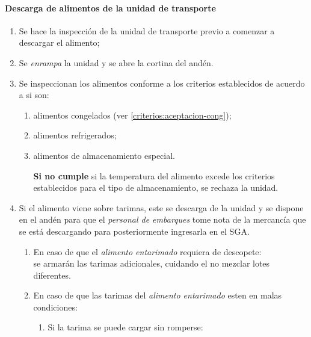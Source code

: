 \paragraph{Descarga de alimentos de la unidad de transporte}\label{sec:DescargaAlimentos}

\begin{enumerate}
    \item Se hace la inspección de la unidad de transporte previo a comenzar a descargar el alimento;
    \item Se \emph{enrampa} la unidad y se abre la cortina del andén.
    \item Se inspeccionan los alimentos conforme a los criterios establecidos de acuerdo a si son:
        \begin{enumerate}
            \item alimentos congelados (ver \cref{criterios:aceptacion-cong});
            \item alimentos refrigerados; 
            \item alimentos de almacenamiento especial.
        \end{enumerate}
        \begin{itemize}
            \item[\textbf{Si no cumple}] si la temperatura del alimento excede los criterios establecidos para el tipo de almacenamiento, se rechaza la unidad.
        \end{itemize}
    \item Si el alimento viene sobre tarimas, este se descarga de la unidad y se dispone en el andén para que el \emph{personal de embarques} tome nota de la mercancía que se está descargando para posteriormente ingresarla en el \gls{SGA}.
    \begin{enumerate}
        \item En caso de que el \emph{alimento entarimado} requiera de descopete:\\
        se armarán las tarimas adicionales, cuidando el no mezclar lotes diferentes.
        \item En caso de que las tarimas del \emph{alimento entarimado} esten en malas condiciones:\\
        \begin{enumerate}
            \item Si la tarima se puede cargar sin romperse:
                \begin{itemize}

\end{itemize}
\end{enumerate}
\end{enumerate}
\end{enumerate}
